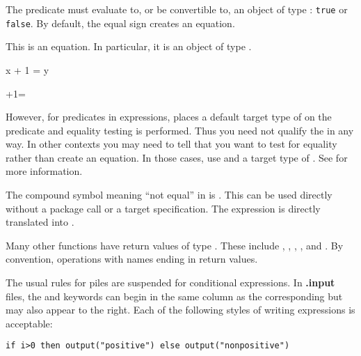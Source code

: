 {The predicate must evaluate to, or be convertible to, an object of type
: {\tt true} or {\tt false}.
By default, the equal sign  creates
an equation.

\begin{xtc}
\begin{xtccomment}
This is an equation.
In particular, it is an object of type .
\end{xtccomment}
\begin{spadsrc}
x + 1 = y
\end{spadsrc}
\begin{TeXOutput}
\begin{fricasmath}{1}
+1=%
\end{fricasmath}
\end{TeXOutput}
\end{xtc}
However, for predicates in  expressions, \Language{}
places a default target type of  on the
predicate and equality testing is performed.
Thus you need not qualify the \spadSyntax{=} in any way.
In other contexts you may need to tell \Language{} that you want
to test for equality rather than create an equation.
In those cases, use  and a target type of
.
See  for more information.

The compound symbol meaning ``not equal'' in \Language{} is
\spadop{~=}.
This can be used directly without a package call or a target specification.
The expression
 is directly translated into
.

Many other functions have return values of type .
These include \spadop{<}, \spadop{<=}, \spadop{>},
\spadop{>=}, \spadop{~=} and .
By convention, operations with names ending in 
return  values.

The usual rules for piles are suspended for conditional expressions.
In {\bf .input} files, the  and
 keywords can begin in the same column as the corresponding
 but may also appear to the right.
Each of the following styles of writing 
expressions is acceptable:
\begin{verbatim}
if i>0 then output("positive") else output("nonpositive")


\end{verbatim}}
